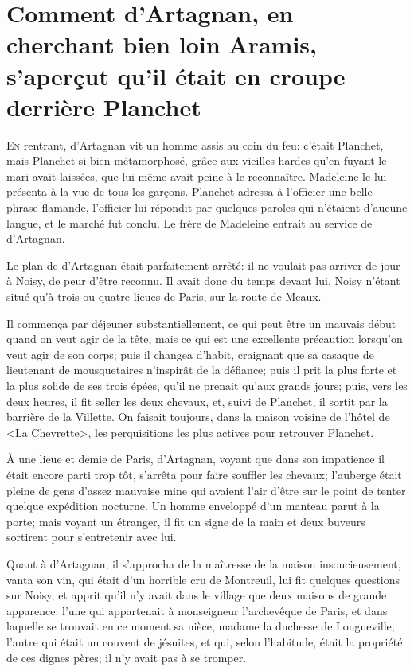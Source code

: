\chapter[Comment d'Artagnan s'aperçut qu'il était derrière Planchet]{Comment d'Artagnan, en cherchant bien loin Aramis, s'aperçut qu'il était en croupe derrière Planchet}

\lettrine{E}{n} rentrant, d'Artagnan vit un homme assis au coin du feu: c'était Planchet, mais Planchet si bien métamorphosé, grâce aux vieilles hardes qu'en fuyant le mari avait laissées, que lui-même avait peine à le reconnaître. Madeleine le lui présenta à la vue de tous les garçons. Planchet adressa à l'officier une belle phrase flamande, l'officier lui répondit par quelques paroles qui n'étaient d'aucune langue, et le marché fut conclu. Le frère de Madeleine entrait au service de d'Artagnan.

Le plan de d'Artagnan était parfaitement arrêté: il ne voulait pas arriver de jour à Noisy, de peur d'être reconnu. Il avait donc du temps devant lui, Noisy n'étant situé qu'à trois ou quatre lieues de Paris, sur la route de Meaux.

Il commença par déjeuner substantiellement, ce qui peut être un mauvais début quand on veut agir de la tête, mais ce qui est une excellente précaution lorsqu'on veut agir de son corps; puis il changea d'habit, craignant que sa casaque de lieutenant de mousquetaires n'inspirât de la défiance; puis il prit la plus forte et la plus solide de ses trois épées, qu'il ne prenait qu'aux grands jours; puis, vers les deux heures, il fit seller les deux chevaux, et, suivi de Planchet, il sortit par la barrière de la Villette. On faisait toujours, dans la maison voisine de l'hôtel de <La Chevrette>, les perquisitions les plus actives pour retrouver Planchet.

À une lieue et demie de Paris, d'Artagnan, voyant que dans son impatience il était encore parti trop tôt, s'arrêta pour faire souffler les chevaux; l'auberge était pleine de gens d'assez mauvaise mine qui avaient l'air d'être sur le point de tenter quelque expédition nocturne. Un homme enveloppé d'un manteau parut à la porte; mais voyant un étranger, il fit un signe de la main et deux buveurs sortirent pour s'entretenir avec lui.

Quant à d'Artagnan, il s'approcha de la maîtresse de la maison insoucieusement, vanta son vin, qui était d'un horrible cru de Montreuil, lui fit quelques questions sur Noisy, et apprit qu'il n'y avait dans le village que deux maisons de grande apparence: l'une qui appartenait à monseigneur l'archevêque de Paris, et dans laquelle se trouvait en ce moment sa nièce, madame la duchesse de Longueville; l'autre qui était un couvent de jésuites, et qui, selon l'habitude, était la propriété de ces dignes pères; il n'y avait pas à se tromper.

